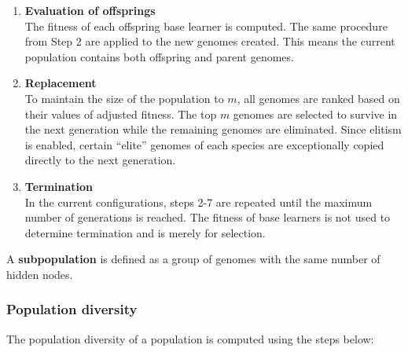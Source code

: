 \documentclass{article}
\begin{document}
\begin{enumerate}
    \item \textbf{Evaluation of offsprings} \\
    The fitness of each offspring base learner is computed. The same procedure from Step 2 are applied to the new genomes created. This means the current population contains both offspring and parent genomes. 

    \item \textbf{Replacement} \\
    To maintain the size of the population to $m$, all genomes are ranked based on their values of adjusted fitness. The top $m$ genomes are selected to survive in the next generation while the remaining genomes are eliminated. Since elitism is enabled, certain ``elite'' genomes of each species are exceptionally copied directly to the next generation. 

    \item \textbf{Termination} \\
    In the current configurations, steps 2-7 are repeated until the maximum number of generations is reached. The fitness of base learners is not used to determine termination and is merely for selection. 
\end{enumerate}

A \textbf{subpopulation} is defined as a group of genomes with the same number of hidden nodes. 


\subsubsection{Population diversity}
\label{subsubsec:neat_ncl_population_diversity}
The population diversity of a population is computed using the steps below: 
\end{document}
